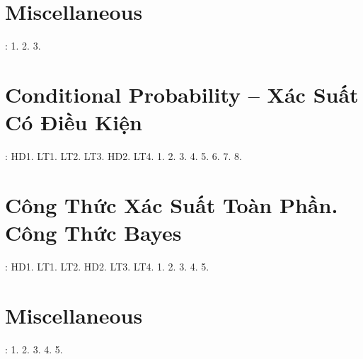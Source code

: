 \documentclass{article}
\begin{document}

\section{Miscellaneous}
\cite[BTCCIII, p. 93]{SGK_Toan_12_Canh_Dieu_tap_1}: 1. 2. 3.


\section{Conditional Probability -- Xác Suất Có Điều Kiện}
\cite[Chap. VI, \S1, pp. 90--96]{SGK_Toan_12_Canh_Dieu_tap_2}: HD1. LT1. LT2. LT3. HD2. LT4. 1. 2. 3. 4. 5. 6. 7. 8.


\section{Công Thức Xác Suất Toàn Phần. Công Thức Bayes}
\cite[Chap. VI, \S2, pp. 97--102]{SGK_Toan_12_Canh_Dieu_tap_2}: HD1. LT1. LT2. HD2. LT3. LT4. 1. 2. 3. 4. 5.


\section{Miscellaneous}
\cite[BTCCVI, p. 103]{SGK_Toan_12_Canh_Dieu_tap_2}: 1. 2. 3. 4. 5.


\printbibliography[heading=bibintoc]
	
\end{document}
